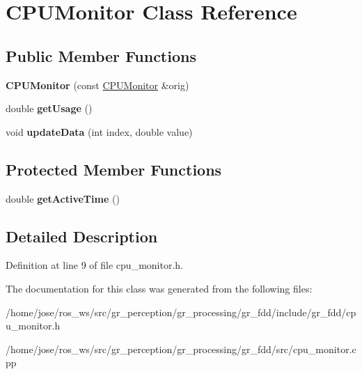 \hypertarget{classCPUMonitor}{}\section{C\+P\+U\+Monitor Class Reference}
\label{classCPUMonitor}
\subsection*{Public Member Functions}
\begin{DoxyCompactItemize}
\item 
\mbox{\label{classCPUMonitor_a5b22e14413db4bcc32e87672afbcf167}} 
{\bfseries C\+P\+U\+Monitor} (const \hyperlink{classCPUMonitor}{C\+P\+U\+Monitor} \&orig)
\item 
\mbox{\label{classCPUMonitor_a52548341cb9811afdd3b44c60a9dc70a}} 
double {\bfseries get\+Usage} ()
\item 
\mbox{\label{classCPUMonitor_a01a9ec23d69f890cd14ac1a10eafb3cd}} 
void {\bfseries update\+Data} (int index, double value)
\end{DoxyCompactItemize}
\subsection*{Protected Member Functions}
\begin{DoxyCompactItemize}
\item 
\mbox{\label{classCPUMonitor_a874c83f8b7167ad3cfa0b18536fd0350}} 
double {\bfseries get\+Active\+Time} ()
\end{DoxyCompactItemize}


\subsection{Detailed Description}


Definition at line 9 of file cpu\+\_\+monitor.\+h.



The documentation for this class was generated from the following files\+:\begin{DoxyCompactItemize}
\item 
/home/jose/ros\+\_\+ws/src/gr\+\_\+perception/gr\+\_\+processing/gr\+\_\+fdd/include/gr\+\_\+fdd/cpu\+\_\+monitor.\+h\item 
/home/jose/ros\+\_\+ws/src/gr\+\_\+perception/gr\+\_\+processing/gr\+\_\+fdd/src/cpu\+\_\+monitor.\+cpp\end{DoxyCompactItemize}
